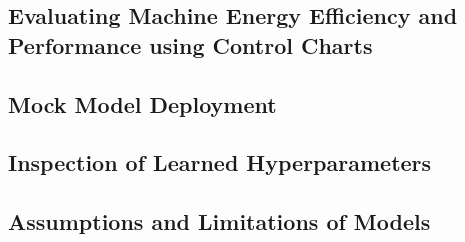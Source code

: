 \subsection{Evaluating Machine Energy Efficiency and Performance using Control Charts}

\subsection{Mock Model Deployment}

\subsection{Inspection of Learned Hyperparameters}

\subsection{Assumptions and Limitations of Models}